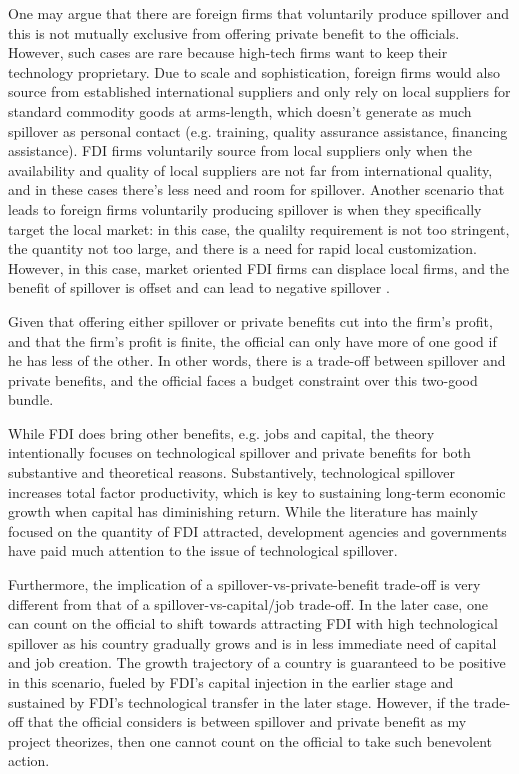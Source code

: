 One may argue that there are foreign firms that voluntarily produce spillover and this is not mutually exclusive from offering private benefit to the officials. However, such cases are rare because high-tech firms want to keep their technology proprietary. Due to scale and sophistication, foreign firms would also source from established international suppliers and only rely on local suppliers for standard commodity goods at arms-length, which doesn't generate as much spillover as personal contact (e.g. training, quality assurance assistance, financing assistance). FDI firms voluntarily source from local suppliers only when the availability and quality of local suppliers are not far from international quality, and in these cases there's less need and room for spillover. Another scenario that leads to foreign firms voluntarily producing spillover is when they specifically target the local market: in this case, the qualilty requirement is not too stringent, the quantity not too large, and there is a need for rapid local customization. However, in this case, market oriented FDI firms can displace local firms, and the benefit of spillover is offset and can lead to negative spillover \citep{Mody2004}.

Given that offering either spillover or private benefits cut into the firm's profit, and that the firm's profit is finite, the official can only have more of one good if he has less of the other. In other words, there is a trade-off between spillover and private benefits, and the official faces a budget constraint over this two-good bundle.

While FDI does bring other benefits, e.g. jobs and capital, the theory intentionally focuses on technological spillover and private benefits for both substantive and theoretical reasons. Substantively, technological spillover increases total factor productivity, which is key to sustaining long-term economic growth when capital has diminishing return. While the literature has mainly focused on the quantity of FDI attracted, development agencies and governments have paid much attention to the issue of technological spillover. 

Furthermore, the implication of a spillover-vs-private-benefit trade-off is very different from that of a spillover-vs-capital/job trade-off. In the later case, one can count on the official to shift towards attracting FDI with high technological spillover as his country gradually grows and is in less immediate need of capital and job creation. The growth trajectory of a country is guaranteed to be positive in this scenario, fueled by FDI's capital injection in the earlier stage and sustained by FDI's technological transfer in the later stage. However, if the trade-off that the official considers is between spillover and private benefit as my project theorizes, then one cannot count on the official to take such benevolent action.

